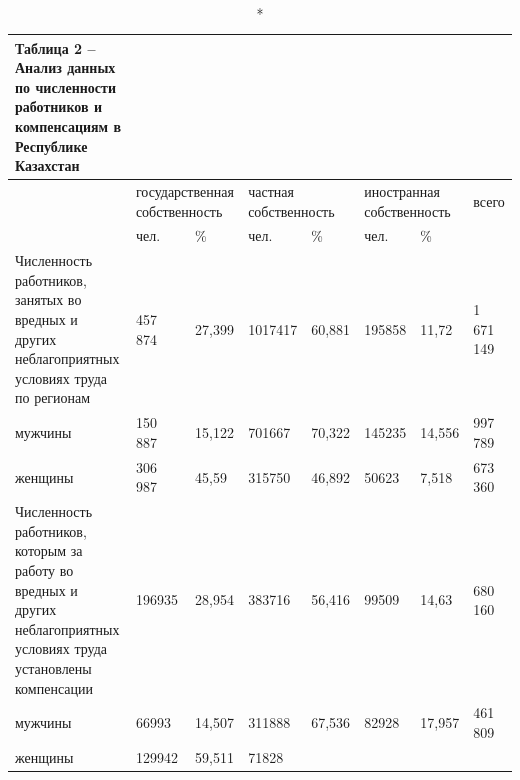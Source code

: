 \begin{longtable}[c]{|llllllll|}
\caption*{Таблица 2 -- Анализ данных по численности работников и компенсациям в Республике Казахстан} \\
\hline
\multicolumn{1}{|l|}{\multirow{2}{*}{}} &
  \multicolumn{2}{p{0.16\textwidth}|}{государственная собственность} &
  \multicolumn{2}{p{0.2\textwidth}|}{частная собственность} &
  \multicolumn{2}{p{0.16\textwidth}|}{иностранная собственность} &
  \multicolumn{1}{|p{0.1\textwidth}|}{всего} \\ \cline{2-8} 
\multicolumn{1}{|l|}{} &
  \multicolumn{1}{l|}{чел.} &
  \multicolumn{1}{l|}{\%} &
  \multicolumn{1}{l|}{чел.} &
  \multicolumn{1}{l|}{\%} &
  \multicolumn{1}{l|}{чел.} &
  \multicolumn{1}{l|}{\%} &
   \\ \hline
\endfirsthead
%
\endhead
%
\multicolumn{1}{|p{0.2\textwidth}|}{Численность работников, занятых во вредных и других неблагоприятных условиях труда по регионам} &
  \multicolumn{1}{l|}{457 874} &
  \multicolumn{1}{l|}{27,399} &
  \multicolumn{1}{l|}{1017417} &
  \multicolumn{1}{l|}{60,881} &
  \multicolumn{1}{l|}{195858} &
  \multicolumn{1}{l|}{11,72} &
  1 671 149 \\ \hline
\multicolumn{1}{|l|}{мужчины} &
  \multicolumn{1}{l|}{150 887} &
  \multicolumn{1}{l|}{15,122} &
  \multicolumn{1}{l|}{701667} &
  \multicolumn{1}{l|}{70,322} &
  \multicolumn{1}{l|}{145235} &
  \multicolumn{1}{l|}{14,556} &
  997 789 \\ \hline
\multicolumn{1}{|l|}{женщины} &
  \multicolumn{1}{l|}{306 987} &
  \multicolumn{1}{l|}{45,59} &
  \multicolumn{1}{l|}{315750} &
  \multicolumn{1}{l|}{46,892} &
  \multicolumn{1}{l|}{50623} &
  \multicolumn{1}{l|}{7,518} &
  673 360 \\ \hline
\multicolumn{1}{|p{0.2\textwidth}|}{Численность работников, которым за работу во вредных и других неблагоприятных условиях труда установлены компенсации} &
  \multicolumn{1}{l|}{196935} &
  \multicolumn{1}{l|}{28,954} &
  \multicolumn{1}{l|}{383716} &
  \multicolumn{1}{l|}{56,416} &
  \multicolumn{1}{l|}{99509} &
  \multicolumn{1}{l|}{14,63} &
  680 160 \\ \hline
\multicolumn{1}{|l|}{мужчины} &
  \multicolumn{1}{l|}{66993} &
  \multicolumn{1}{l|}{14,507} &
  \multicolumn{1}{l|}{311888} &
  \multicolumn{1}{l|}{67,536} &
  \multicolumn{1}{l|}{82928} &
  \multicolumn{1}{l|}{17,957} &
  461 809 \\ \hline
\multicolumn{1}{|l|}{женщины} &
  \multicolumn{1}{l|}{129942} &
  \multicolumn{1}{l|}{59,511} &
  \multicolumn{1}{l|}{71828} &

\end{longtable}
